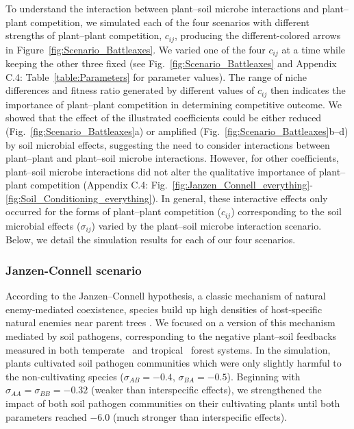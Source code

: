 To understand the interaction between plant--soil microbe interactions and plant--plant competition, we simulated each of the four scenarios with different strengths of plant--plant competition, $c_{ij}$, producing the different-colored arrows in Figure~\ref{fig:Scenario_Battleaxes}.
We varied one of the four $c_{ij}$ at a time while keeping the other three fixed (see Fig.~\ref{fig:Scenario_Battleaxes} and Appendix C.4: Table~\ref{table:Parameters} for parameter values).
The range of niche differences and fitness ratio generated by different values of $c_{ij}$ then indicates the importance of plant--plant competition in determining competitive outcome. We showed that the effect of the illustrated coefficients could be either reduced (Fig.~\ref{fig:Scenario_Battleaxes}a) or amplified (Fig.~\ref{fig:Scenario_Battleaxes}b--d) by soil microbial effects, suggesting the need to consider interactions between plant--plant and plant--soil microbe interactions.
However, for other coefficients, plant--soil microbe interactions did not alter the qualitative importance of plant--plant competition (Appendix C.4: Fig.~\ref{fig:Janzen_Connell_everything}-\ref{fig:Soil_Conditioning_everything}).
In general, these interactive effects only occurred for the forms of plant--plant competition ($c_{ij}$) corresponding to the soil microbial effects ($\sigma_{ij}$) varied by the plant--soil microbe interaction scenario.
Below, we detail the simulation results for each of our four scenarios.
\par



\subsubsection*{Janzen-Connell scenario}
According to the Janzen--Connell hypothesis, a classic mechanism of natural enemy-mediated coexistence, species build up high densities of host-specific natural enemies near parent trees \citep{Augspurger1984}. We focused on a version of this mechanism mediated by soil pathogens, corresponding to the negative plant--soil feedbacks measured in both temperate~\cite{Bennett2017} and tropical~\citep{Mangan2010} forest systems. In the simulation, plants cultivated soil pathogen communities which were only slightly harmful to the non-cultivating species ($\sigma_{AB} = -0.4$, $\sigma_{BA} = -0.5$). Beginning with $\sigma_{AA} = \sigma_{BB} = -0.32$ (weaker than interspecific effects), we strengthened the impact of both soil pathogen communities on their cultivating plants until both parameters reached $-6.0$ (much stronger than interspecific effects).
\par


